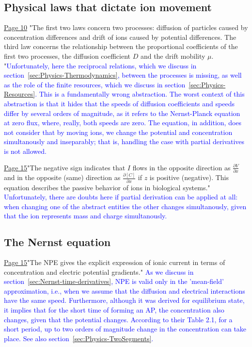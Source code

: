 \subsection{Physical laws that dictate ion movement\label{sec:Physics-PhysicalLaws}}
\href{https://rcweb.dartmouth.edu/~mvdm/wiki/lib/exe/fetch.php?media=analysis:johnstonwu.pdf}{Page 10} "The first two laws concern two processes: diffusion of particles caused
by concentration differences and drift of ions caused by potential differences. The third law concerns the relationship between the proportional
coefficients of the first two processes, the diffusion coefficient $D$ and the
drift mobility $\mu$. "\textcolor{blue}{Unfortunately, here the reciprocal relations, which we discuss in section~\ref{sec:Physics-Thermodynamics}, between the processes is missing, as well as the role of the finite resources, which we
discuss in section~\ref{sec:Physics-Resources}. This is a fundamentally wrong abstraction. The worst context of this abstraction is that it hides that the speeds of diffusion coefficients and speeds differ by several orders of magnitude, as it refers to the Nernst-Planck equation at zero flux, where, really, both speeds are zero. The equation, in addition, does not consider that by moving ions, we change the potential and concentration simultanously and
inseparably; that is, handling the case with partial derivatives is not allowed.
}

\href{https://rcweb.dartmouth.edu/~mvdm/wiki/lib/exe/fetch.php?media=analysis:johnstonwu.pdf}{Page 15}"The
negative sign indicates that $I$ flows in the opposite direction as $\frac{\partial V}{\partial x}$ and in
the opposite (same) direction as $\frac{\partial [C]}{\partial x}$
if $z$ is positive (negative).
This equation describes the passive behavior of ions in biological systems." \textcolor{blue}{Unfortunately, there are doubts here if partial derivation can be applied at all: when changing one of the abstract entities the other changes simultanously, given that the ion represents mass and charge simultanously.}

\subsection{The Nernst equation\label{sec:Physics-NernstEquation}}
\href{https://rcweb.dartmouth.edu/~mvdm/wiki/lib/exe/fetch.php?media=analysis:johnstonwu.pdf}{Page 15}"The NPE gives the explicit expression of ionic current in terms of concentration and electric potential gradients." \textcolor{blue}{As we discuss in section~\ref{sec:Nernst-time-derivatives}, NPE is valid only in the 'mean-field' approximation, i.e., when we assume that the diffusion and electrical interactions have the same speed. Furthermore, although it was derived for equilibrium state, it implies that for the short time of forming an
AP, the concentration also changes, given that the potential changes. According to their Table 2.1, for a short period, up to two orders of magnitude change in the
concentration can take place. See also section~\ref{sec:Physics-TwoSegments}.
}

